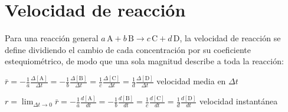 \documentclass[10pt,letterpaper]{article}
\begin{document}

\section{Velocidad de reacción}
Para una reacción general $a\,\mathrm{A}+b\,\mathrm{B}\to c\,\mathrm{C}+d\,\mathrm{D}$, la velocidad de reacción se define
dividiendo el cambio de cada concentración por su coeficiente estequiométrico, de modo que una sola magnitud describe a
toda la reacción:

\begin{clave}
$\displaystyle \bar r=-\frac{1}{a}\frac{\Delta[\mathrm{A}]}{\Delta t}=-\frac{1}{b}\frac{\Delta[\mathrm{B}]}{\Delta t}
=\frac{1}{c}\frac{\Delta[\mathrm{C}]}{\Delta t}=\frac{1}{d}\frac{\Delta[\mathrm{D}]}{\Delta t}$
\hfill\small velocidad media en $\Delta t$
\end{clave}
\begin{clave}
$\displaystyle r=\lim_{\Delta t\to0}\bar r=-\frac{1}{a}\frac{d[\mathrm{A}]}{dt}=-\frac{1}{b}\frac{d[\mathrm{B}]}{dt}
=\frac{1}{c}\frac{d[\mathrm{C}]}{dt}=\frac{1}{d}\frac{d[\mathrm{D}]}{dt}$
\hfill\small velocidad instantánea
\end{clave}
\end{document}
